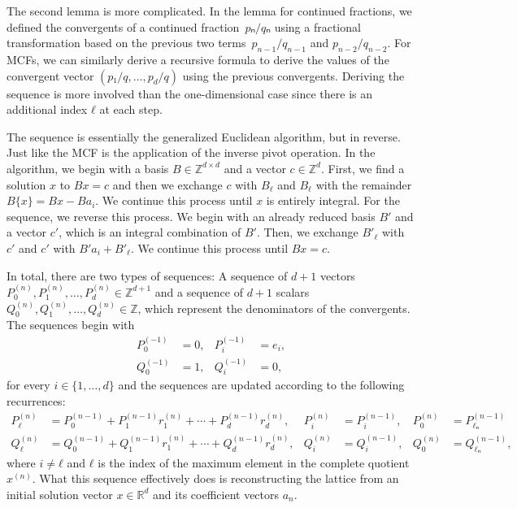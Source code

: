 The second lemma is more complicated.
In the lemma for continued fractions,
we defined the convergents of a continued fraction~$pₙ/qₙ$
using a fractional transformation based on the previous two
terms~$p_{n-1}/q_{n-1}$ and $p_{n-2}/q_{n-2}$.
For MCFs, we can similarly derive a recursive formula to derive the values of
the convergent vector $(p₁/q, \dots, p_d/q)$ using the previous convergents.
Deriving the sequence is more involved than the one-dimensional case since
there is an additional index $ℓ$ at each step.

The sequence is essentially the generalized Euclidean algorithm, but in reverse.
Just like the MCF is the application of the inverse pivot operation.
In the algorithm, we begin with a basis $B ∈ ℤ^{d×d}$ and a vector $c ∈ ℤ^d$.
First, we find a solution $x$ to $Bx = c$ and then we exchange $c$ with $B_ℓ$
and $B_ℓ$ with the remainder $B\{x\} = Bx - Ba_i$.
We continue this process until $x$ is entirely integral.
For the sequence, we reverse this process.
We begin with an already reduced basis $B'$ and a vector $c'$, which is an
integral combination of $B'$.
Then, we exchange $B'_{ℓ}$ with $c'$ and $c'$ with $B' a_i + B'_{ℓ}$.
We continue this process until $B x = c$.

In total, there are two types of sequences:
A sequence of $d+1$ vectors $P_0^{(n)}, P_1^{(n)}, …, P_d^{(n)} ∈ ℤ^{d+1}$ and a sequence
of $d+1$ scalars $Q_0^{(n)}, Q_1^{(n)}, …, Q_d^{(n)} ∈ ℤ$,
which represent the denominators of the convergents.
The sequences begin with
\begin{align*}
  P_0^{(-1)} & = 0, & P_i^{(-1)} & = e_i, \\
  Q_0^{(-1)} & = 1, & Q_i^{(-1)} & = 0,
\end{align*}
for every $i ∈ \{1, …, d\}$ and the sequences are updated according to the
following recurrences:
\begin{align*}
  P_ℓ^{(n)} & = P_0^{(n-1)} + P_1^{(n-1)} r_1^{(n)} + ⋯ + P_d^{(n-1)} r_d^{(n)}, &
  P_i^{(n)} & = P_i^{(n-1)}, &
  P_0^{(n)} & = P_{ℓₙ}^{(n-1)} \\
  Q_ℓ^{(n)} & = Q_0^{(n-1)} + Q_1^{(n-1)} r_1^{(n)} + ⋯ + Q_d^{(n-1)} r_d^{(n)}, &
  Q_i^{(n)} & = Q_i^{(n-1)}, &
  Q_0^{(n)} & = Q_{ℓₙ}^{(n-1)},
\end{align*}
where $i ≠ ℓ$ and $ℓ$ is the index of the maximum element in the complete
quotient $x^{(n)}$. %
What this sequence effectively does is reconstructing the lattice from an
initial solution vector $x ∈ ℝ^d$ and its coefficient vectors $a_n$.


